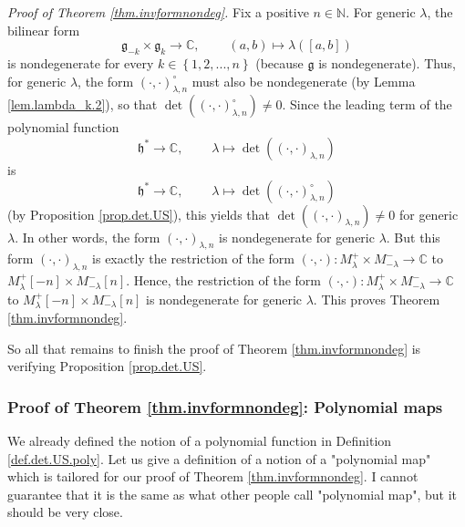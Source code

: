 \documentclass
[numbers=enddot,12pt,final,onecolumn,german,notitlepage]{scrartcl}%
\theoremstyle{definition}
\begin{document}
\textit{Proof of Theorem \ref{thm.invformnondeg}.} Fix a positive
$n\in\mathbb{N}$. For generic $\lambda$, the bilinear form%
\[
\mathfrak{g}_{-k}\times\mathfrak{g}_{k}\rightarrow\mathbb{C}%
,\ \ \ \ \ \ \ \ \ \ \left(  a,b\right)  \mapsto\lambda\left(  \left[
a,b\right]  \right)
\]
is nondegenerate for every $k\in\left\{  1,2,...,n\right\}  $ (because
$\mathfrak{g}$ is nondegenerate). Thus, for generic $\lambda$, the form
$\left(  \cdot,\cdot\right)  _{\lambda,n}^{\circ}$ must also be nondegenerate
(by Lemma \ref{lem.lambda_k.2}), so that $\det\left(  \left(  \cdot
,\cdot\right)  _{\lambda,n}^{\circ}\right)  \neq0$. Since the leading term of
the polynomial function
\[
\mathfrak{h}^{\ast}\rightarrow\mathbb{C},\ \ \ \ \ \ \ \ \ \ \lambda
\mapsto\det\left(  \left(  \cdot,\cdot\right)  _{\lambda,n}\right)
\]
is%
\[
\mathfrak{h}^{\ast}\rightarrow\mathbb{C},\ \ \ \ \ \ \ \ \ \ \lambda
\mapsto\det\left(  \left(  \cdot,\cdot\right)  _{\lambda,n}^{\circ}\right)
\]
(by Proposition \ref{prop.det.US}), this yields that $\det\left(  \left(
\cdot,\cdot\right)  _{\lambda,n}\right)  \neq0$ for generic $\lambda$. In
other words, the form $\left(  \cdot,\cdot\right)  _{\lambda,n}$ is
nondegenerate for generic $\lambda$. But this form $\left(  \cdot
,\cdot\right)  _{\lambda,n}$ is exactly the restriction of the form $\left(
\cdot,\cdot\right)  :M_{\lambda}^{+}\times M_{-\lambda}^{-}\rightarrow
\mathbb{C}$ to $M_{\lambda}^{+}\left[  -n\right]  \times M_{-\lambda}%
^{-}\left[  n\right]  $. Hence, the restriction of the form $\left(
\cdot,\cdot\right)  :M_{\lambda}^{+}\times M_{-\lambda}^{-}\rightarrow
\mathbb{C}$ to $M_{\lambda}^{+}\left[  -n\right]  \times M_{-\lambda}%
^{-}\left[  n\right]  $ is nondegenerate for generic $\lambda$. This proves
Theorem \ref{thm.invformnondeg}.

So all that remains to finish the proof of Theorem \ref{thm.invformnondeg} is
verifying Proposition \ref{prop.det.US}.

\subsubsection{Proof of Theorem \ref{thm.invformnondeg}: Polynomial maps}

We already defined the notion of a polynomial function in Definition
\ref{def.det.US.poly}. Let us give a definition of a notion of a "polynomial
map" which is tailored for our proof of Theorem \ref{thm.invformnondeg}. I
cannot guarantee that it is the same as what other people call "polynomial
map", but it should be very close.
\end{document}
